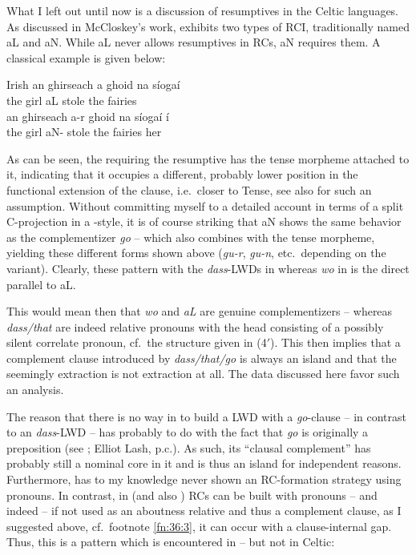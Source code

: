 \documentclass[output=paper]{langsci/langscibook}
\begin{document}
What I left out until now is a discussion of resumptives in the Celtic
languages. As discussed in McCloskey’s work,  exhibits two types of RCI,
traditionally named aL and aN. While aL never allows resumptives in \glspl{RC},
aN requires them. A classical example is given below:\largerpage[2]

\ea\label{ex:36.18}Irish
    \ea
    \gll    an ghirseach a ghoid na síogaí\\
             the girl aL stole the fairies \underline{\hphantom{2em}}\\
    \ex
    \gll    an ghirseach a-r            ghoid na síogaí í\\
            the girl aN-\Pst{} stole the fairies her\\
    \z
\z

As can be seen, the \Rci{} requiring the resumptive has the tense morpheme
attached to it, indicating that it occupies a different, probably lower
position in the functional extension of the clause, i.e.\ closer to Tense, see
also \citet{Roberts2005} for such an assumption. Without committing myself to a
detailed account in terms of a split C-projection in a \citet{Rizzi1997}-style,
it is of course striking that aN shows the same behavior as the complementizer
\emph{go} -- which also combines with the tense morpheme, yielding these
different forms shown above (\emph{gu-r}, \emph{gu-n}, etc.\ depending on the
variant). Clearly, these pattern with the \emph{dass}-\glspl{LWD} in  whereas
\emph{wo} in  is the direct parallel to aL.

This would mean then that  \emph{wo} and  \emph{aL} are genuine
complementizers -- whereas \emph{dass/that} are indeed relative pronouns with
the head consisting of a possibly silent correlate pronoun, cf.\ the structure
given in (4$'$). This then implies that a complement clause introduced by
\emph{dass/that/go} is always an island and that the seemingly extraction is
not extraction at all. The data discussed here favor such an analysis.

The reason that there is no way in  to build a \gls{LWD} with a
\emph{go}-clause -- in contrast to an  \emph{dass}-\gls{LWD} --
has probably to do with the fact that \emph{go} is originally a preposition
(see \citealt{Braesicke}; Elliot Lash, p.c.). As such, its \enquote{clausal
complement} has probably still a nominal core in it and is thus an island for
independent reasons.  Furthermore,  has to my knowledge never shown an
RC-formation strategy using pronouns. In contrast, in  (and also
) \glspl{RC} can be built with pronouns -- and indeed -- if not
used as an aboutness relative and thus a complement clause, as I suggested
above, cf.\ footnote \ref{fn:36:3}, it can occur with a clause-internal gap. Thus, this is
a pattern which is encountered in  -- but not in Celtic:
\end{document}
